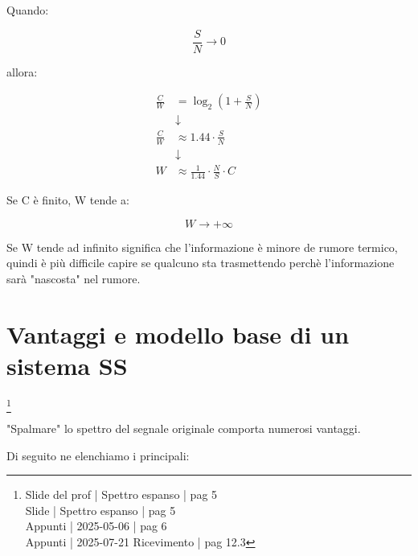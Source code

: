 Quando: 

{
    \Large 
    \begin{equation}
        \frac{S}{N} \to 0
    \end{equation}
}

allora: 

{
    \Large 
    \begin{equation}
        \begin{split}
            \frac{C}{W}
            &=
            \log_{2}
            \left(
                1 + \frac{S}{N}
            \right)
            \\
            &\downarrow
            \\
            \frac{C}{W}
            &\approx
            1.44 \cdot \frac{S}{N} 
            \\
            &\downarrow
            \\
            W 
            &\approx 
            \frac{1}{1.44}
            \cdot 
            \frac{N}{S}
            \cdot 
            C
        \end{split}
    \end{equation}
}

Se C è finito, W tende a: 

{
    \Large 
    \begin{equation}
        W \to + \infty
    \end{equation}
}

Se W tende ad infinito significa che l'informazione è minore de rumore termico, 
quindi è più difficile capire se qualcuno sta trasmettendo 
perchè l'informazione sarà "nascosta" nel rumore. \newline 

\newpage 

\section{Vantaggi e modello base di un sistema SS }
\footnote{Slide del prof | Spettro espanso | pag 5 \\
Slide | Spettro espanso | pag 5 \\
Appunti | 2025-05-06 | pag 6 \\
Appunti | 2025-07-21 Ricevimento | pag 12.3
} 

"Spalmare" lo spettro del segnale originale comporta numerosi vantaggi. \newline 

Di seguito ne elenchiamo i principali: 

